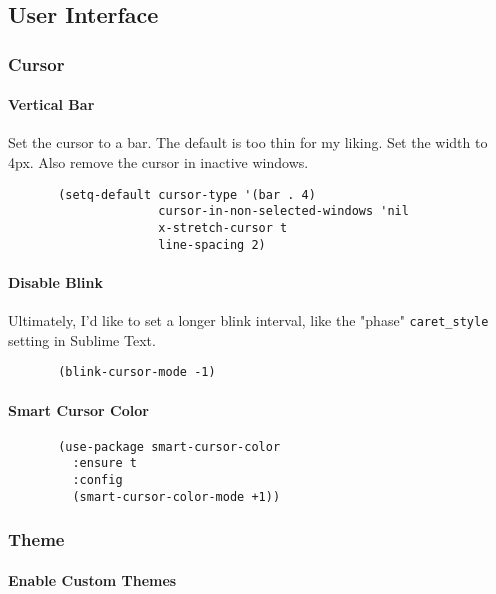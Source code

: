 \documentclass[11pt]{article}
\begin{document}
\subsection*{User Interface}
\label{sec:org0829b8c}
\subsubsection*{Cursor}
\label{sec:org4195e0a}
\paragraph*{Vertical Bar}
\label{sec:org87fb0b8}

Set the cursor to a bar. The default is too thin for my liking.
Set the width to 4px. Also remove the cursor in inactive windows.

\begin{verbatim}
       (setq-default cursor-type '(bar . 4)
                     cursor-in-non-selected-windows 'nil
                     x-stretch-cursor t
                     line-spacing 2)
\end{verbatim}

\paragraph*{Disable Blink}
\label{sec:org87498db}

Ultimately, I'd like to set a longer blink interval, like the "phase"
\texttt{caret\_style} setting in Sublime Text.

\begin{verbatim}
       (blink-cursor-mode -1)
\end{verbatim}

\paragraph*{Smart Cursor Color}
\label{sec:orgf351920}

\begin{verbatim}
       (use-package smart-cursor-color
         :ensure t
         :config
         (smart-cursor-color-mode +1))
\end{verbatim}

\subsubsection*{Theme}
\label{sec:org7dc16f0}
\paragraph*{Enable Custom Themes}
\label{sec:org8815990}
\end{document}
